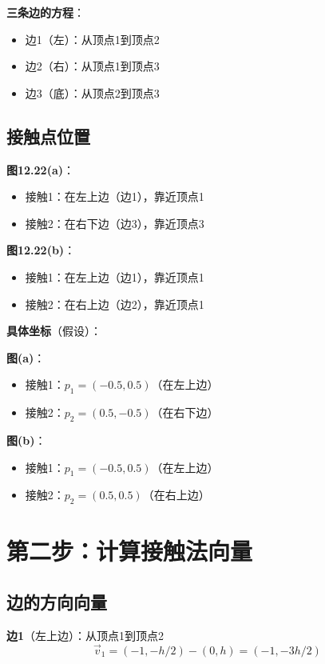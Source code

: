 \documentclass[12pt,a4paper]{article}
\begin{document}
\textbf{三条边的方程}：
\begin{itemize}
\item 边1（左）：从顶点1到顶点2
\item 边2（右）：从顶点1到顶点3
\item 边3（底）：从顶点2到顶点3
\end{itemize}

\subsection{接触点位置}

\textbf{图12.22(a)}：
\begin{itemize}
\item 接触1：在左上边（边1），靠近顶点1
\item 接触2：在右下边（边3），靠近顶点3
\end{itemize}

\textbf{图12.22(b)}：
\begin{itemize}
\item 接触1：在左上边（边1），靠近顶点1
\item 接触2：在右上边（边2），靠近顶点1
\end{itemize}

\textbf{具体坐标}（假设）：

\textbf{图(a)}：
\begin{itemize}
\item 接触1：$p_1 = (-0.5, 0.5)$（在左上边）
\item 接触2：$p_2 = (0.5, -0.5)$（在右下边）
\end{itemize}

\textbf{图(b)}：
\begin{itemize}
\item 接触1：$p_1 = (-0.5, 0.5)$（在左上边）
\item 接触2：$p_2 = (0.5, 0.5)$（在右上边）
\end{itemize}

\section{第二步：计算接触法向量}

\subsection{边的方向向量}

\textbf{边1}（左上边）：从顶点1到顶点2
\begin{equation}
\vec{v}_1 = (-1, -h/2) - (0, h) = (-1, -3h/2)
\end{equation}
\end{document}
